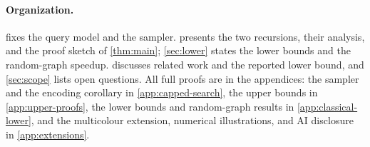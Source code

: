 \paragraph{Organization.}
 fixes the query model and the sampler.
 presents the two recursions, their analysis, and the
proof sketch of \cref{thm:main}; \cref{sec:lower} states the lower bounds
and the random-graph speedup.   discusses related work
and the reported lower bound, and \cref{sec:scope} lists open questions.
All full proofs are in the appendices: the sampler and the encoding
corollary in \cref{app:capped-search}, the upper bounds in
\cref{app:upper-proofs}, the lower bounds and random-graph results in
\cref{app:classical-lower}, and the multicolour extension, numerical
illustrations, and AI disclosure in \cref{app:extensions}.
